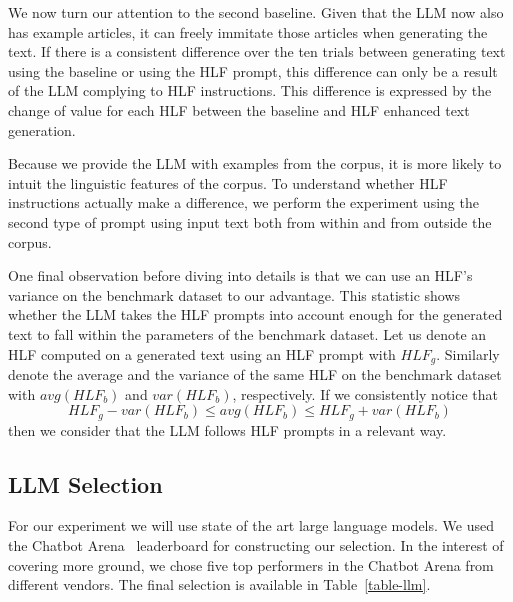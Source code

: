 \documentclass[runningheads,a4paper,11pt]{article}
\begin{document}
We now turn our attention to the second baseline.
Given that the LLM now also has example articles, it can freely immitate those
articles when generating the text.
If there is a consistent difference over the ten trials between generating text
using the baseline or using the HLF prompt, this difference can only be a result
of the LLM complying to HLF instructions.
This difference is expressed by the change of value for each HLF between the
baseline and HLF enhanced text generation.

Because we provide the LLM with examples from the corpus, it is more likely to
intuit the linguistic features of the corpus.
To understand whether HLF instructions actually make a difference, we perform
the experiment using the second type of prompt using input text both from within
and from outside the corpus.

One final observation before diving into details is that we can use an HLF's
variance on the benchmark dataset to our advantage.
This statistic shows whether the LLM takes the HLF prompts into account enough
for the generated text to fall within the parameters of the benchmark dataset.
Let us denote an HLF computed on a generated text using an HLF prompt with
$HLF_g$.
Similarly denote the average and the variance of the same HLF on the benchmark
dataset with $avg(HLF_b)$ and $var(HLF_b)$, respectively.
If we consistently notice that
\[HLF_g - var(HLF_b) \leq avg(HLF_b) \leq HLF_g + var(HLF_b)\]
then we consider that the LLM follows HLF prompts in a relevant way.

\subsection{LLM Selection}\label{llm-selection}

For our experiment we will use state of the art large language models.
We used the Chatbot Arena~\cite{chiang2024chatbot} leaderboard for constructing
our selection.
In the interest of covering more ground, we chose five top performers in the
Chatbot Arena from different vendors.
The final selection is available in Table~\ref{table-llm}.
\end{document}
